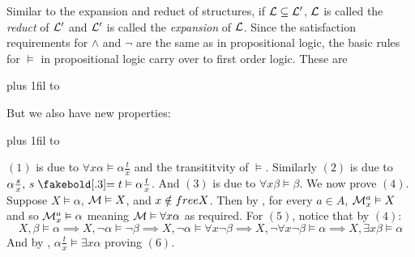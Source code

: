 Similar to the expansion and reduct of structures, if ${\cal L}\subseteq{\cal L'}$, ${\cal L}$ is called the {\it reduct} of ${\cal L}'$ and ${\cal L'}$ is called the {\it expansion} of ${\cal L}$.
Since the satisfaction requirements for $\land$ and $\neg$ are the same as in propositional logic, the basic rules for $\vDash$ in propositional logic carry over to first order logic.
These are

\medskip
\tabskip=0pt plus 1fil
{\jot\halign to}
\medskip

But we also have new properties:

\medskip
\tabskip=0pt plus 1fil
{\jot\halign to}

\medskip
$(1)$ is due to $\forall x\alpha\vDash\alpha\frac tx$ and the transititvity of $\vDash$.
Similarly $(2)$ is due to $\alpha\frac sx,\,s\eq t\vDash\alpha\frac tx$.
And $(3)$ is due to $\forall x\beta\vDash\beta$.
We now prove $(4)$.
Suppose $X\vDash\alpha$, ${\cal M}\vDash X$, and $x\notin{\sl free} X$.
Then by , for every $a\in A$, ${\cal M}^a_x\vDash X$ and so ${\cal M}^a_x\vDash\alpha$ meaning ${\cal M}\vDash\forall x\alpha$ as required.
For $(5)$, notice that by $(4)$:
$$ X,\beta\vDash\alpha \implies X,\neg\alpha\vDash\neg\beta \implies X,\neg\alpha\vDash\forall x\neg\beta \implies X,\neg\forall x\neg\beta\vDash\alpha \implies X,\exists x\beta\vDash\alpha $$
And by , $\alpha\frac tx\vDash\exists x\alpha$ proving $(6)$.

